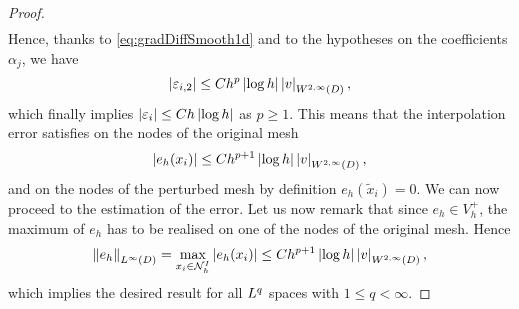 \documentclass[10pt]{article}
\begin{document}
\begin{proof}
\begin{equation}
\begin{aligned}
	\end{aligned}
	\end{equation}
	Hence, thanks to \eqref{eq:gradDiffSmooth1d} and to the hypotheses on the coefficients $\alpha_j$, we have
	\begin{equation}
		\left\lvert\varepsilon_{i,2}\right\rvert \leq C h^p \left\lvert\log h\right\rvert \left\lvert v\right\rvert_{W^{2, \infty}(D)},
	\end{equation} 
	which finally implies $\left\lvert\varepsilon_i\right\rvert \leq C h \left\lvert\log h\right\rvert$ as $p\geq 1$. This means that the interpolation error satisfies on the nodes of the original mesh 
	\begin{equation}
		\left\lvert e_h(x_i)\right\rvert \leq C h^{p+1} \left\lvert\log h\right\rvert \left\lvert v\right\rvert_{W^{2, \infty}(D)},
	\end{equation}
	and on the nodes of the perturbed mesh by definition $e_h(\tilde x_i) = 0$. We can now proceed to the estimation of the error. Let us now remark that since $e_h \in V_h^+$, the maximum of $e_h$ has to be realised on one of the nodes of the original mesh. Hence
	\begin{equation}
		\left\|e_h\right\|_{L^{\infty}(D)} = \max_{x_i \in \mathcal N_h^{I}} \left\lvert e_h(x_i)\right\rvert \leq C h^{p+1} \left\lvert\log h\right\rvert \left\lvert v\right\rvert_{W^{2, \infty}(D)},
	\end{equation}
	which implies the desired result for all $L^q$ spaces with $1 \leq q < \infty$.

\end{proof}
\end{document}
